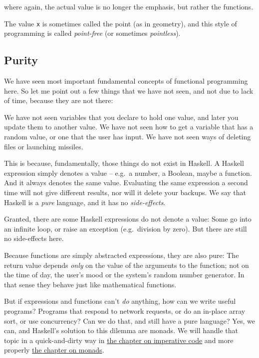 \documentclass[11pt,
  american,
  DIV13]{article}
\begin{document}
where again, the actual value is no longer the emphasis, but rather the
functions.

The value \texttt{x} is sometimes called the point (as in geometry), and
this style of programming is called \emph{point-free} (or sometimes
\emph{pointless}).

\hypertarget{pure}{%
\subsection{Purity}\label{pure}}

We have seen most important fundamental concepts of functional
programming here. So let me point out a few things that we have not
seen, and not due to lack of time, because they are not there:

We have not seen variables that you declare to hold one value, and later
you update them to another value. We have not seen how to get a variable
that has a random value, or one that the user has input. We have not
seen ways of deleting files or launching missiles.

This is because, fundamentally, those things do not exist in Haskell. A
Haskell expression simply denotes a value -- e.g.~a number, a Boolean,
maybe a function. And it always denotes the same value. Evaluating the
same expression a second time will not give different results, nor will
it delete your backups. We say that Haskell is a \emph{pure} language,
and it has no \emph{side-effects}.

Granted, there are some Haskell expressions do not denote a value: Some
go into an infinite loop, or raise an exception (e.g.~division by zero).
But there are still no side-effects here.

Because functions are simply abstracted expressions, they are also pure:
The return value depends \emph{only} on the value of the arguments to
the function; not on the time of day, the user's mood or the system's
random number generator. In that sense they behave just like
mathematical functions.

But if expressions and functions can't \emph{do} anything, how can we
write useful programs? Programs that respond to network requests, or do
an in-place array sort, or use concurrency? Can we do that, and still
have a pure language? Yes, we can, and Haskell's solution to this
dilemma are monads. We will handle that topic in a quick-and-dirty way
in \protect\hyperlink{io}{the chapter on imperative code} and more
properly \protect\hyperlink{monads}{the chapter on monads}.
\end{document}
